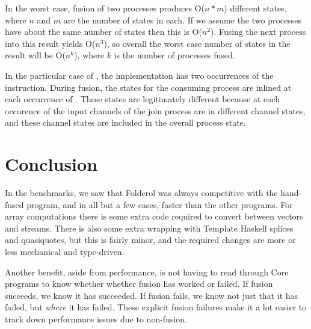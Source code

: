 In the worst case, fusion of two processes produces O($n*m$) different states, where $n$ and $m$ are the number of states in each. If we assume the two processes have about the same number of states then this is O($n^2$). Fusing the next process into this result yields O($n^3$), so overall the worst case number of states in the result will be O($n^k$), where $k$ is the number of processes fused. 

In the particular case of \Hs@join@, the implementation has two occurrences of the \Hs@push@ instruction. During fusion, the states for the consuming process are inlined at each occurrence of \Hs@push@. These states are legitimately different because at each occurence of \Hs@push@ the input channels of the join process are in different channel states, and these channel states are included in the overall process state.


\section{Conclusion}
In the benchmarks, we saw that Folderol was always competitive with the hand-fused program, and in all but a few cases, faster than the other programs.
For array computations there is some extra code required to convert between vectors and streams.
There is also some extra wrapping with Template Haskell splices and quasiquotes, but this is fairly minor, and the required changes are more or less mechanical and type-driven.

Another benefit, aside from performance, is not having to read through Core programs to know whether whether fusion has worked or failed.
If fusion succeeds, we know it has succeeded.
If fusion fails, we know not just that it has failed, but \emph{where} it has failed.
These explicit fusion failures make it a lot easier to track down performance issues due to non-fusion.

